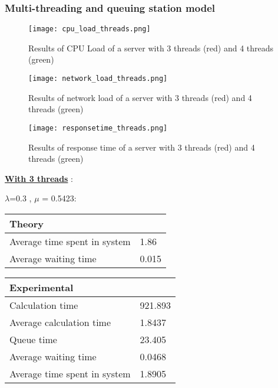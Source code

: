 \subsubsection{Multi-threading and queuing station model}
\label{subs:Multi-threading and queuing station model}

\begin{figure}[!ht]
    \centering
    \texttt{[image: cpu\_load\_threads.png]}
    \caption{Results of CPU Load of a server with 3 threads (red) and 4 threads (green)}
    \label{fig:cpuload_threads}
\end{figure}

\begin{figure}[!ht]
    \centering
    \texttt{[image: network\_load\_threads.png]}
    \caption{Results of network load of a server with 3 threads (red) and 4 threads (green)}
    \label{fig:network_threads}
\end{figure}

\begin{figure}[!ht]
    \centering
    \texttt{[image: responsetime\_threads.png]}
    \caption{Results of response time of a server with 3 threads (red) and 4 threads (green)}
    \label{fig:responsetime_threads}
\end{figure}

\underline{\textbf{With 3 threads}} :

\begin{minipage}{\linewidth}
   $\lambda$=0.3 , $\mu$ = 0.5423:

    \bigskip
    \begin{minipage}{0.45\linewidth}
        \begin{tabular}{|l|l|}
            \hline
            Theory & \\
            \hline
            Average time spent in system & 1.86 \\
            Average waiting time & 0.015 \\
            \hline
        \end{tabular}
    \end{minipage}
    \begin{minipage}{0.45\linewidth}
        \begin{tabular}{|l|l|}
            \hline
            Experimental & \\
            \hline
            Calculation time & 921.893 \\
            Average calculation time & 1.8437 \\
            Queue time & 23.405 \\
            Average waiting time & 0.0468  \\
            Average time spent in system & 1.8905 \\
            \hline
        \end{tabular}
    \end{minipage}
    \bigskip
\end{minipage}


